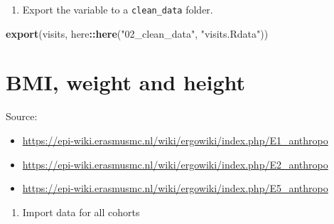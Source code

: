 \documentclass[]{book}
\newenvironment{Shaded}{\begin{snugshade}}{\end{snugshade}}
\newcommand{\KeywordTok}[1]{\textcolor[rgb]{0.13,0.29,0.53}{\textbf{#1}}}
\newcommand{\NormalTok}[1]{#1}
\newcommand{\OperatorTok}[1]{\textcolor[rgb]{0.81,0.36,0.00}{\textbf{#1}}}
\newcommand{\StringTok}[1]{\textcolor[rgb]{0.31,0.60,0.02}{#1}}
\providecommand{\tightlist}{%
  \setlength{\itemsep}{0pt}\setlength{\parskip}{0pt}}
\begin{document}
\begin{enumerate}
\def\labelenumi{\arabic{enumi}.}
\setcounter{enumi}{6}
\tightlist
\item
  Export the variable to a \texttt{clean\_data} folder.
\end{enumerate}

\begin{Shaded}
\begin{Highlighting}[]
\KeywordTok{export}\NormalTok{(visits, here}\OperatorTok{::}\KeywordTok{here}\NormalTok{(}\StringTok{"02_clean_data"}\NormalTok{, }\StringTok{"visits.Rdata"}\NormalTok{))}
\end{Highlighting}
\end{Shaded}

\hypertarget{bmi}{%
\chapter{BMI, weight and height}\label{bmi}}

Source:

\begin{itemize}
\tightlist
\item
  \url{https://epi-wiki.erasmusmc.nl/wiki/ergowiki/index.php/E1_anthropo}
\item
  \url{https://epi-wiki.erasmusmc.nl/wiki/ergowiki/index.php/E2_anthropo}
\item
  \url{https://epi-wiki.erasmusmc.nl/wiki/ergowiki/index.php/E5_anthropo}
\end{itemize}

\begin{enumerate}
\def\labelenumi{\arabic{enumi}.}
\tightlist
\item
  Import data for all cohorts
\end{enumerate}
\end{document}
